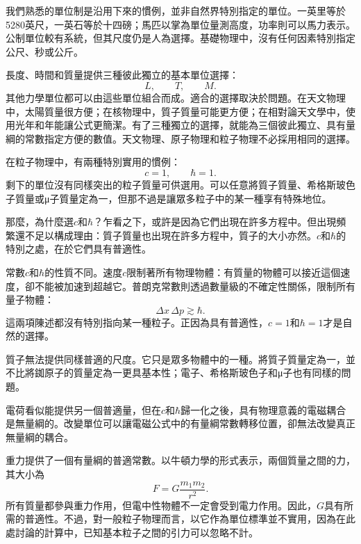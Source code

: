 我們熟悉的單位制是沿用下來的慣例，並非自然界特別指定的單位。一英里等於5280英尺，一英石等於十四磅；馬匹以掌為單位量測高度，功率則可以馬力表示。公制單位較有系統，但其尺度仍是人為選擇。基礎物理中，沒有任何因素特別指定公尺、秒或公斤。

長度、時間和質量提供三種彼此獨立的基本單位選擇：
\begin{equation}
L,\qquad T,\qquad M.
\end{equation}
其他力學單位都可以由這些單位組合而成。適合的選擇取決於問題。在天文物理中，太陽質量很方便；在核物理中，質子質量可能更方便；在相對論天文學中，使用光年和年能讓公式更簡潔。有了三種獨立的選擇，就能為三個彼此獨立、具有量綱的常數指定方便的數值。天文物理、原子物理和粒子物理不必採用相同的選擇。

在粒子物理中，有兩種特別實用的慣例：
\begin{equation}
c=1,
\qquad
\hbar=1.
\end{equation}
剩下的單位沒有同樣突出的粒子質量可供選用。可以任意將質子質量、希格斯玻色子質量或{\proseunicodefont μ}子質量定為一，但那不過是讓眾多粒子中的某一種享有特殊地位。

那麼，為什麼選\(c\)和\(\hbar\)？乍看之下，或許是因為它們出現在許多方程中。但出現頻繁還不足以構成理由：質子質量也出現在許多方程中，質子的大小亦然。\(c\)和\(\hbar\)的特別之處，在於它們具有普適性。

常數\(c\)和\(\hbar\)的性質不同。速度\(c\)限制著所有物理物體：有質量的物體可以接近這個速度，卻不能被加速到超越它。普朗克常數則透過數量級的不確定性關係，限制所有量子物體：
\begin{equation}
\Delta x\,\Delta p\gtrsim\hbar.
\end{equation}
這兩項陳述都沒有特別指向某一種粒子。正因為具有普適性，\(c=1\)和\(\hbar=1\)才是自然的選擇。

質子無法提供同樣普適的尺度。它只是眾多物體中的一種。將質子質量定為一，並不比將銣原子的質量定為一更具基本性；電子、希格斯玻色子和{\proseunicodefont μ}子也有同樣的問題。

電荷看似能提供另一個普適量，但在\(c\)和\(\hbar\)歸一化之後，具有物理意義的電磁耦合是無量綱的。改變單位可以讓電磁公式中的有量綱常數轉移位置，卻無法改變真正無量綱的耦合。

重力提供了一個有量綱的普適常數。以牛頓力學的形式表示，兩個質量之間的力，其大小為
\begin{equation}
F=G\frac{m_1m_2}{r^2}.
\end{equation}
所有質量都參與重力作用，但電中性物體不一定會受到電力作用。因此，\(G\)具有所需的普適性。不過，對一般粒子物理而言，以它作為單位標準並不實用，因為在此處討論的計算中，已知基本粒子之間的引力可以忽略不計。

